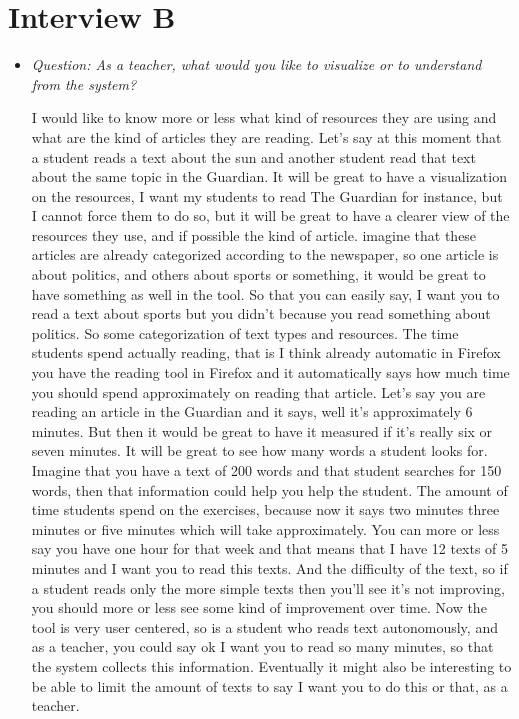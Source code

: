 \chapter{Interview B}\label{interview02}
\begin{itemize}
	
		\item \textit{Question: As a teacher, what would you like to visualize or to understand from the system?}
		
I would like to know more or less what kind of resources they are using and what are the kind of articles they are reading. Let's say at this moment that a student reads a text about the sun and another student read that text about the same topic in the Guardian. It will be great to have a visualization on the resources, I want my students to read The Guardian for instance, but I cannot force them to do so, but it will be great to have a clearer view of the resources they use, and if possible the kind of article.
imagine that these articles are already categorized according to the newspaper, so one article is about politics, and others about sports or something, it would be great to have something as well in the tool. So that you can easily say, I want you to read a text about sports but you didn't because you read something about politics.
So some categorization of text types and resources. 
The time students spend actually reading, that is I think already automatic in Firefox you have the reading tool in Firefox and it automatically says how much time you should spend approximately on reading that article. Let's say you are reading an article in the Guardian and it says, well it's approximately 6 minutes. But then it would be great to have it measured if it's really six or seven minutes.
It will be great to see how many words a student looks for. Imagine that you have a text of 200 words and that student searches for 150 words, then that information could help you help the student.
The amount of time students spend on the exercises, because now it says two minutes three minutes or five minutes which will take approximately.
You can more or less say you have one hour for that week and that means that I have 12 texts of 5 minutes and I want you to read this texts.
And the difficulty of the text, so if a student reads only the more simple texts then you'll see it's not improving, you should more or less see some kind of improvement over time. 
Now the tool is very user centered, so is a student who reads text autonomously, and as a teacher, you could say ok I want you to read so many minutes, so that the system collects this information.
Eventually it might also be interesting to be able to limit the amount of texts to say I want you to do this or that, as a teacher. 


\end{itemize}
